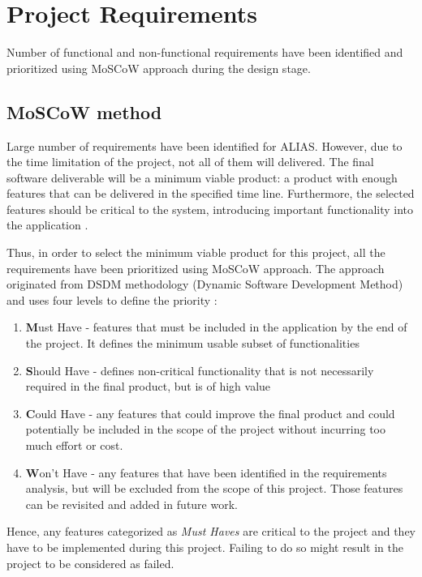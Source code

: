 \section{Project Requirements} \label{label:projectRequirements}
Number of functional and non-functional requirements have been identified and prioritized using MoSCoW approach during the design stage. 

\subsection{MoSCoW method}
Large number of requirements have been identified for ALIAS. However, due to the time limitation of the project, not all of them will delivered. The final software deliverable will be a minimum viable product: a product with enough features that can be delivered in the specified time line. Furthermore, the selected features should be critical to the system, introducing important functionality into the application \citep{mvp}.

Thus, in order to select the minimum viable product for this project, all the requirements have been prioritized using MoSCoW approach. The approach originated from DSDM methodology (Dynamic Software Development Method) and uses four levels to define the priority \citep{moscow}:

\begin{enumerate}
	\item \textbf{M}ust Have - features that must be included in the application by the end of the project. It defines the minimum usable subset of functionalities 
	\item \textbf{S}hould Have - defines non-critical functionality that is not necessarily required in the final product, but is of high value
	\item \textbf{C}ould Have - any features that could improve the final product and could potentially be included in the scope of the project without incurring too much effort or cost.
	\item \textbf{W}on't Have - any features that have been identified in the requirements analysis, but will be excluded from the scope of this project. Those features can be revisited and added in future work.
\end{enumerate}

Hence, any features categorized as \textit{Must Haves} are critical to the project and they have to be implemented during this project. Failing to do so might result in the project to be considered as failed. 

